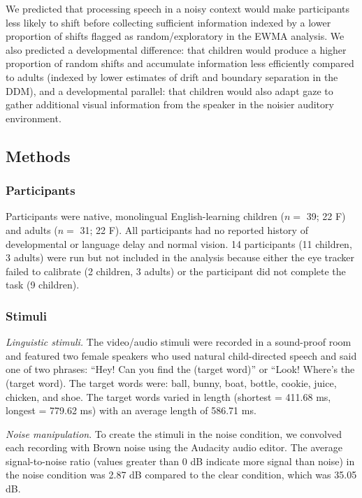 \documentclass[oneside]{report}
\begin{document}
We predicted that processing speech in a noisy context would make
participants less likely to shift before collecting sufficient
information indexed by a lower proportion of shifts flagged as
random/exploratory in the EWMA analysis. We also predicted a
developmental difference: that children would produce a higher
proportion of random shifts and accumulate information less efficiently
compared to adults (indexed by lower estimates of drift and boundary
separation in the DDM), and a developmental parallel: that children
would also adapt gaze to gather additional visual information from the
speaker in the noisier auditory environment.

\subsection{Methods}\label{methods-2}

\subsubsection{Participants}\label{participants-1}

Participants were native, monolingual English-learning children (\(n=\)
39; 22 F) and adults (\(n=\) 31; 22 F). All participants had no reported
history of developmental or language delay and normal vision. 14
participants (11 children, 3 adults) were run but not included in the
analysis because either the eye tracker failed to calibrate (2 children,
3 adults) or the participant did not complete the task (9 children).

\subsubsection{Stimuli}\label{stimuli-2}

\emph{Linguistic stimuli.} The video/audio stimuli were recorded in a
sound-proof room and featured two female speakers who used natural
child-directed speech and said one of two phrases: ``Hey! Can you find
the (target word)'' or ``Look! Where's the (target word). The target
words were: ball, bunny, boat, bottle, cookie, juice, chicken, and shoe.
The target words varied in length (shortest = 411.68 ms, longest =
779.62 ms) with an average length of 586.71 ms.

\emph{Noise manipulation}. To create the stimuli in the noise condition,
we convolved each recording with Brown noise using the Audacity audio
editor. The average signal-to-noise ratio (values greater than 0 dB
indicate more signal than noise) in the noise condition was 2.87 dB
compared to the clear condition, which was 35.05 dB.
\end{document}
